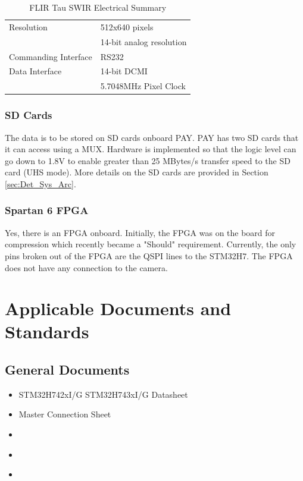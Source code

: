 \documentclass[12pt,a4paper]{article}
\begin{document}
    \begin{table}[H]\centering
        \begin{tabular}{l | l}
            Resolution & 512x640 pixels \\
            & 14-bit analog resolution \\ \hline
            Commanding Interface & RS232 \\ \hline
            Data Interface & 14-bit DCMI\\
            & 5.7048MHz Pixel Clock\\
        \end{tabular}
        \caption{FLIR Tau SWIR Electrical Summary}
    \end{table}

    \subsubsection{SD Cards}
    The data is to be stored on SD cards onboard PAY. PAY has two SD cards that 
    it can access using a MUX. Hardware is implemented so that the logic level 
    can go down to 1.8V to enable greater than 25 MBytes/s transfer speed to the 
    SD card (UHS mode). More details on the SD cards are provided in 
    Section \ref{sec:Det_Sys_Arc}. 

    \subsubsection{Spartan 6 FPGA}
    Yes, there is an FPGA onboard. Initially, the FPGA was on the board for compression 
    which recently became a "Should" requirement. Currently, the only pins broken out of 
    the FPGA are the QSPI lines to the STM32H7. The FPGA does not have any connection to 
    the camera. 

    \newpage
    \section{Applicable Documents and Standards}\label{sec:methods}
    \subsection{General Documents}
    \begin{itemize}
        \item STM32H742xI/G STM32H743xI/G Datasheet
        \item Master Connection Sheet
        \item \cite{TAU_ProdSpec}
        \item \cite{TAU_SDD}
        \item \cite{TAU_UserGuide}
    \end{itemize}
\end{document}
